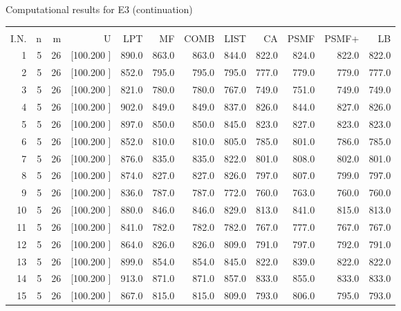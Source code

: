 \documentclass[12pt,a4paper]{article}
\begin{document}
\newpage
\begin{center}
 Computational results for E3 (continuation) {\tiny
\begin{tabular}{r r r r r r r r r r r r}\hline
    &   &   &          &        &        &        &        &        &        &        &       \\[-0.1in]
  I.N.  &  n  &  m  &  U  &  LPT  &  MF  &  COMB  &  LIST  &  CA  & PSMF &PSMF+ & LB \\[0.03in]
\hline
   1&  5& 26&[100.200   ]&   890.0&   863.0&   863.0&   844.0&   822.0&   824.0&   822.0&   822.0\\[-0.02in]
   2&  5& 26&[100.200   ]&   852.0&   795.0&   795.0&   795.0&   777.0&   779.0&   779.0&   777.0\\[-0.02in]
   3&  5& 26&[100.200   ]&   821.0&   780.0&   780.0&   767.0&   749.0&   751.0&   749.0&   749.0\\[-0.02in]
   4&  5& 26&[100.200   ]&   902.0&   849.0&   849.0&   837.0&   826.0&   844.0&   827.0&   826.0\\[-0.02in]
   5&  5& 26&[100.200   ]&   897.0&   850.0&   850.0&   845.0&   823.0&   827.0&   823.0&   823.0\\[-0.02in]
   6&  5& 26&[100.200   ]&   852.0&   810.0&   810.0&   805.0&   785.0&   801.0&   786.0&   785.0\\[-0.02in]
   7&  5& 26&[100.200   ]&   876.0&   835.0&   835.0&   822.0&   801.0&   808.0&   802.0&   801.0\\[-0.02in]
   8&  5& 26&[100.200   ]&   874.0&   827.0&   827.0&   826.0&   797.0&   807.0&   799.0&   797.0\\[-0.02in]
   9&  5& 26&[100.200   ]&   836.0&   787.0&   787.0&   772.0&   760.0&   763.0&   760.0&   760.0\\[-0.02in]
  10&  5& 26&[100.200   ]&   880.0&   846.0&   846.0&   829.0&   813.0&   841.0&   815.0&   813.0\\[-0.02in]
  11&  5& 26&[100.200   ]&   841.0&   782.0&   782.0&   782.0&   767.0&   777.0&   767.0&   767.0\\[-0.02in]
  12&  5& 26&[100.200   ]&   864.0&   826.0&   826.0&   809.0&   791.0&   797.0&   792.0&   791.0\\[-0.02in]
  13&  5& 26&[100.200   ]&   899.0&   854.0&   854.0&   845.0&   822.0&   839.0&   822.0&   822.0\\[-0.02in]
  14&  5& 26&[100.200   ]&   913.0&   871.0&   871.0&   857.0&   833.0&   855.0&   833.0&   833.0\\[-0.02in]
  15&  5& 26&[100.200   ]&   867.0&   815.0&   815.0&   809.0&   793.0&   806.0&   795.0&   793.0\\[-0.02in]

\end{tabular}}
\end{center}
\end{document}
